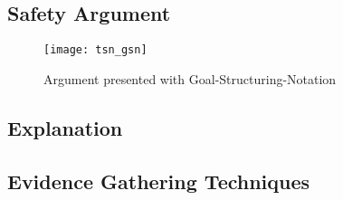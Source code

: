 \subsection{Safety Argument}

\begin{figure}[h]
\centering
\texttt{[image: tsn\_gsn]}
\caption{Argument presented with Goal-Structuring-Notation}
\end{figure}

\subsection{Explanation}

\subsection{Evidence Gathering Techniques}

